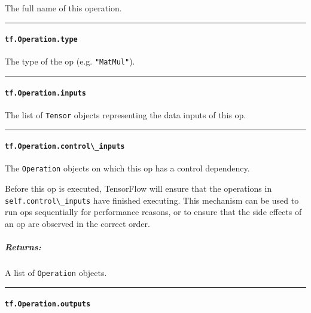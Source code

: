 The full name of this operation.

\begin{center}\rule{0.5\linewidth}{\linethickness}\end{center}

\paragraph{\texorpdfstring{\lstinline{tf.Operation.type}
}{tf.Operation.type }}\label{tf.operation.type}

The type of the op (e.g. \lstinline{"MatMul"}).

\begin{center}\rule{0.5\linewidth}{\linethickness}\end{center}

\paragraph{\texorpdfstring{\lstinline{tf.Operation.inputs}
}{tf.Operation.inputs }}\label{tf.operation.inputs}

The list of \lstinline{Tensor} objects representing the data inputs of this
op.

\begin{center}\rule{0.5\linewidth}{\linethickness}\end{center}

\paragraph{\texorpdfstring{\lstinline{tf.Operation.control\_inputs}
}{tf.Operation.control\_inputs }}\label{tf.operation.controlux5finputs}

The \lstinline{Operation} objects on which this op has a control
dependency.

Before this op is executed, TensorFlow will ensure that the operations
in \lstinline{self.control\_inputs} have finished executing. This mechanism
can be used to run ops sequentially for performance reasons, or to
ensure that the side effects of an op are observed in the correct order.

\subparagraph{Returns: }\label{returns-14}

A list of \lstinline{Operation} objects.

\begin{center}\rule{0.5\linewidth}{\linethickness}\end{center}

\paragraph{\texorpdfstring{\lstinline{tf.Operation.outputs}
}{tf.Operation.outputs }}\label{tf.operation.outputs}

